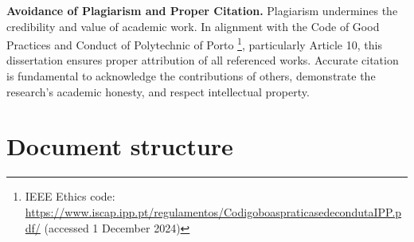 \textbf{Avoidance of Plagiarism and Proper Citation.} Plagiarism undermines the credibility and value of academic work. In alignment with the Code of Good Practices and Conduct of Polytechnic of Porto \footnote{IEEE Ethics code: \url{https://www.iscap.ipp.pt/regulamentos/CodigoboaspraticasedecondutaIPP.pdf/} (accessed 1 December 2024)}, particularly Article 10, this dissertation ensures proper attribution of all referenced works. Accurate citation is fundamental to acknowledge the contributions of others, demonstrate the research’s academic honesty, and respect intellectual property.

\section{Document structure} 